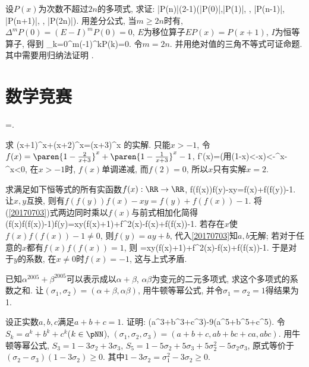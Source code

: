 设$P(x)$为次数不超过$2n$的多项式, 求证:
\bee
|P(n)|\le(2-1)\max(|P(0)|,|P(1)|, \cdots, |P(n-1)|, |P(n+1)|, \cdots, |P(2n)|).
\eee
\eq
\ba
用差分公式, 当$m\ge2n$时有, $\Delta^mP(0)=(E-I)^mP(0)=0$, $E$为移位算子$EP(x)=P(x+1)$, $I$为恒等算子, 得到
\bee
\sum_{k=0}^{m}(-1)^kP(k)=0.
\eee
令$m=2n$. 并用绝对值的三角不等式可证命题. 其中需要用归纳法证明
\bee
{}\ge{}.
\eee
\ea


\section{数学竞赛}
\bee
{}=.
\eee
\eq

\bq{}{}
求
\bee
(x+1)^x+(x+2)^x=(x+3)^x
\eee
的实解.
\eq
\ba
只能$x>-1$, 令$f(x)=\paren{1-\frac2{x+3}}^x+\paren{1-\frac1{x+3}}^x-1$,
\bee
f'(x)=\cdots(\textrm{用}\ln(1-x)<-x)<-^x-^x<0,
\eee
在$x>-1$时, $f(x)$单调递减, 而$f(2)=0$, 所以$x$只有实解$x=2$.
\ea

\bq{}{}
求满足如下恒等式的所有实函数$f(x):\RR\to\RR$,
\be\label{20170703}
f(f(x))f(y)-xy=f(x)+f(f(y))-1.
\ee
\eq
\ba
让$x,y$互换, 则有$f(f(y))f(x)-xy=f(y)+f(f(x))-1$. 将(\ref{20170703})式两边同时乘以$f(x)$与前式相加化简得
\bee
(f(x)f(f(x))-1)f(y)=xy(f(x)+1)+f^2(x)-f(x)+f(f(x))-1.
\eee
若存在$x$使$f(x)f(f(x))-1\ne0$, 则$f(y)=ay+b$, 代入\ref{20170703}知$a,b$无解;
若对于任意的$x$都有$f(x)f(f(x))=1$, 则
=xy(f(x)+1)+f^2(x)-f(x)+f(f(x))-1.
\eee
于是对于$y$的系数, 在$x\ne0$时$f(x)=-1$, 这与上式矛盾.
\ea


已知$\alpha^{2005}+\beta^{2005}$可以表示成以$\alpha+\beta$, $\alpha\beta$为变元的二元多项式, 求这个多项式的系数之和.
\eq
\ba
让$(\sigma_1, \sigma_2)=(\alpha+\beta, \alpha\beta)$, 用牛顿等幂公式, 并令$\sigma_1=\sigma_2=1$得结果为1.
\ea

设正实数$a,b,c$满足$a+b+c=1$. 证明:
(a^3+b^3+c^3)-9(a^5+b^5+c^5).
\eee
\eq
\ba
令$S_k=a^k+b^k+c^k$($k\in\pNN$), $(\sigma_1,\sigma_2,\sigma_3)=(a+b+c,ab+bc+ca,abc)$. 用牛顿等幂公式,
$S_3=1-3\sigma_2+3\sigma_3$, $S_5=1-5\sigma_2+5\sigma_3+5\sigma_2^2-5\sigma_2\sigma_3$, 原式等价于
$(\sigma_2-\sigma_3)(1-3\sigma_2)\ge0$. 其中$1-3\sigma_2=\sigma_1^2-3\sigma_2\ge0$.
\ea

